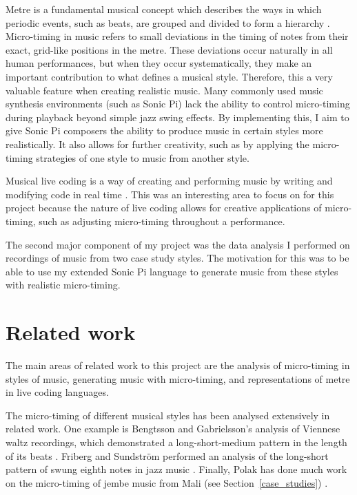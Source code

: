 \documentclass[12pt,twoside,openright]{report}
\begin{document}
Metre is a fundamental musical concept which describes the ways in which periodic events, such as beats, are grouped and divided to form a hierarchy \cite{london2012}. Micro-timing in music refers to small deviations in the timing of notes from
their exact, grid-like positions in the metre. These
deviations occur naturally in all human performances, but when they occur
systematically, they make an important contribution to what defines a musical
style. Therefore, this a very valuable feature when creating realistic music.
Many commonly used music synthesis environments (such as Sonic Pi) lack the
ability to control micro-timing during playback beyond simple jazz swing effects.
By implementing this, I aim to give Sonic Pi composers the ability to produce
music in certain styles more realistically. It also allows for further
creativity, such as by applying the micro-timing strategies of one style to
music from another style.

Musical live coding is a way of creating and performing music by writing
and modifying code in real time \cite{magnusson2011}. This was an interesting area to focus on for
this project because the nature of live coding allows for creative applications
of micro-timing, such as adjusting micro-timing throughout a performance.

The second major component of my project was the data analysis I performed
on recordings of music from two case study styles. The motivation for this was
to be able to use my extended Sonic Pi language to generate music from these styles with
realistic micro-timing.



\section{Related work} \label{related_work}

The main areas of related work to this project are the analysis of micro-timing in styles of music, generating music with micro-timing, and representations of metre in live coding languages.

The micro-timing of different musical styles has been analysed extensively in related work. One example is Bengtsson and Gabrielsson's analysis of Viennese waltz recordings, which demonstrated a long-short-medium pattern in the length of its beats \cite{bengtsson1977}. Friberg and Sundström performed an analysis of the long-short pattern of swung eighth notes in jazz music \cite{friberg2002}. Finally, Polak has done much work on the micro-timing of jembe music from Mali (see Section~\ref{case_studies}) \cite{polak2010,london2017,jacoby2021}.
\end{document}
